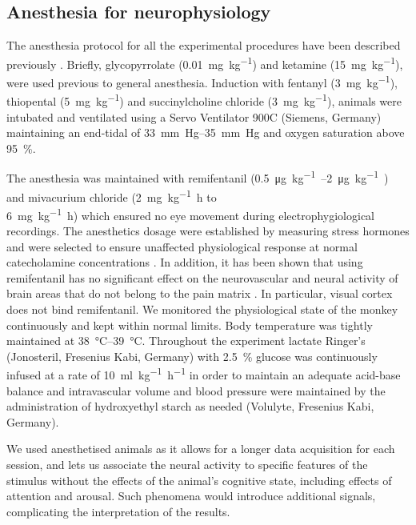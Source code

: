 \subsection{Anesthesia for neurophysiology}

The anesthesia protocol for all the experimental procedures have been described previously \citep{Logothetis1999,Logothetis2001}.
Briefly, glycopyrrolate (\SI{0.01}{mg.{kg}^{-1}}) and ketamine (\SI{15}{mg.{kg}^{-1}}), were used previous to general anesthesia.
Induction with fentanyl (\SI{3}{mg.{kg}^{-1}}), thiopental (\SI{5}{mg.{kg}^{-1}}) and succinylcholine chloride (\SI{3}{mg.{kg}^{-1}}), animals were intubated and ventilated using a Servo Ventilator 900C (Siemens, Germany) maintaining an end-tidal  of \SIrange{33}{35}{mm.Hg} and oxygen saturation above \SI{95}{\percent}.

The anesthesia was maintained with remifentanil (\SIrange{0.5}{2}{\micro\gram.kg^{-1}.\min}) and mivacurium chloride (\SI{2}{mg.kg^{-1}.h} to\\\SI{6}{mg.kg^{-1}.h}) which ensured no eye movement during electrophygiological recordings.
The anesthetics dosage were established by measuring stress hormones and were selected to ensure unaffected physiological response at normal catecholamine concentrations \citep{Logothetis1999}.
In addition, it has been shown that using remifentanil has no significant effect on the neurovascular and neural activity of brain areas that do not belong to the pain matrix \citep{Goense2008,Zappe2008}.
In particular, visual cortex does not bind remifentanil.
We monitored the physiological state of the monkey continuously and kept within normal limits.
Body temperature was tightly maintained at \SIrange{38}{39}{\celsius}.
Throughout the experiment lactate Ringer's (Jonosteril, Fresenius Kabi, Germany) with \SI{2.5}{\percent} glucose was continuously infused at a rate of \SI{10}{ml.kg^{-1}.h^{-1}} in order to maintain an adequate acid-base balance and intravascular volume and blood pressure were maintained by the administration of hydroxyethyl starch as needed (Volulyte, Fresenius Kabi, Germany).

We used anesthetised animals as it allows for a longer data acquisition for each session, and lets us associate the neural activity to specific features of the stimulus without the effects of the animal's cognitive state, including effects of attention and arousal.
Such phenomena would introduce additional signals, complicating the interpretation of the results.


